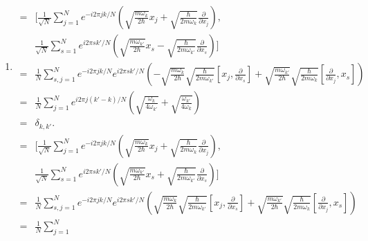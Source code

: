 \begin{enumerate}
       \item 
       \begin{align*}
           [\hat a_{k-}, \hat a_{k'+}]
           =&\bigg[
           \frac{1}{\sqrt{N}}
           \sum_{j=1}^N e^{-i2\pi jk /N}
           \left(\sqrt{\frac{m\omega_k}{2\hbar}}x_j+
           \sqrt{\frac{\hbar}{2m\omega_k}}\frac{\partial}{\partial x_j}\right),\\
           &\frac{1}{\sqrt{N}}
           \sum_{s=1}^N e^{i2\pi sk' /N}
           \left(\sqrt{\frac{m\omega_{k'}}{2\hbar}}x_s-
           \sqrt{\frac{\hbar}{2m\omega_{k'}}}\frac{\partial}{\partial x_s}\right)
           \bigg]\\
           =&
           \frac{1}{N}
           \sum_{s,j=1}^N
           e^{-i2\pi jk /N}
           e^{i2\pi sk' /N}
           (
            -\sqrt{\frac{m\omega_k}{2\hbar}}\sqrt{\frac{\hbar}{2m\omega_{k'}}}
            [x_j, \frac{\partial}{\partial x_s}]
           +\sqrt{\frac{m\omega_{k'}}{2\hbar}}\sqrt{\frac{\hbar}{2m\omega_{k}}}
           [\frac{\partial}{\partial x_j}, x_s]
           )\\
           =&
           \frac{1}{N}
           \sum_{j=1}^N
           e^{i2\pi j(k'-k)/N}
            (
            \sqrt{\frac{\omega_k}{4\omega_{k'}}}
           +\sqrt{\frac{\omega_{k'}}{4\omega_k}}
           )\\
           =&\delta_{k,k'}.
       \end{align*}
       \begin{align*}
           [\hat a_{k-}, \hat a_{k'-}]
           =&\bigg[
           \frac{1}{\sqrt{N}}
           \sum_{j=1}^N e^{-i2\pi jk /N}
           \left(\sqrt{\frac{m\omega_k}{2\hbar}}x_j+
           \sqrt{\frac{\hbar}{2m\omega_k}}\frac{\partial}{\partial x_j}\right),\\
           &\frac{1}{\sqrt{N}}
           \sum_{s=1}^N e^{i2\pi sk' /N}
           \left(\sqrt{\frac{m\omega_{k'}}{2\hbar}}x_s+
           \sqrt{\frac{\hbar}{2m\omega_{k'}}}\frac{\partial}{\partial x_s}\right)
           \bigg]\\
           =&
           \frac{1}{N}
           \sum_{s,j=1}^N
           e^{-i2\pi jk /N}
           e^{i2\pi sk' /N}
           (
            \sqrt{\frac{m\omega_k}{2\hbar}}\sqrt{\frac{\hbar}{2m\omega_{k'}}}
            [x_j, \frac{\partial}{\partial x_s}]
           +\sqrt{\frac{m\omega_{k'}}{2\hbar}}\sqrt{\frac{\hbar}{2m\omega_{k}}}
           [\frac{\partial}{\partial x_j}, x_s]
           )\\
           =&
           \frac{1}{N}
           \sum_{j=1}^N

\end{align*}
\end{enumerate}
